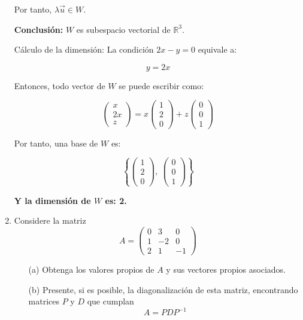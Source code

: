 \documentclass[a4paper]{article}
\begin{document}
\begin{enumerate}
Por tanto, \(\lambda \vec{u} \in W\).

\bigskip

\textbf{Conclusión:} \(W\) es subespacio vectorial de \(\mathbb{R}^3\).

Cálculo de la dimensión: La condición \(2x - y = 0\) equivale a:

\[
y = 2x
\]

Entonces, todo vector de \(W\) se puede escribir como:

\[
\begin{pmatrix}
x \\
2x \\
z
\end{pmatrix}
= x \begin{pmatrix} 1 \\ 2 \\ 0 \end{pmatrix}
+ z \begin{pmatrix} 0 \\ 0 \\ 1 \end{pmatrix}
\]

Por tanto, una base de \(W\) es:

\[
\left\{
\begin{pmatrix} 1 \\ 2 \\ 0 \end{pmatrix},\ 
\begin{pmatrix} 0 \\ 0 \\ 1 \end{pmatrix}
\right\}
\]

\textbf{Y la dimensión de \(W\) es: 2.}

\newpage

\item Considere la matriz
\[
A = 
\begin{pmatrix}
0 & 3 & 0 \\
1 & -2 & 0 \\
2 & 1 & -1
\end{pmatrix}
\]

\begin{itemize}
\item[(a)] Obtenga los valores propios de \(A\) y sus vectores propios asociados.
\item[(b)] Presente, si es posible, la diagonalización de esta matriz, encontrando matrices \(P\) y \(D\) que cumplan
\[
A = P D P^{-1}
\]
\end{itemize}


\end{enumerate}
\end{document}
